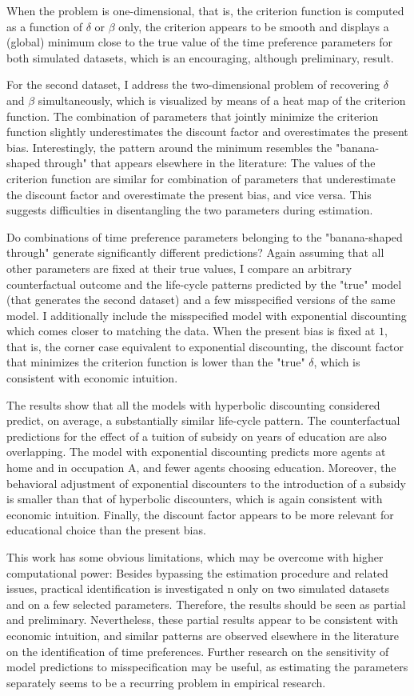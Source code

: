 When the problem is one-dimensional, that is, the criterion function is computed as a function of $\delta$ or $\beta$ only, the criterion appears to be smooth and displays a (global) minimum close to the true value of the time preference parameters for both simulated datasets, which is an encouraging, although preliminary, result. 

For the second dataset, I address the two-dimensional problem of recovering $\delta$ and $\beta$ simultaneously, which is visualized by means of a heat map of the criterion function. The combination of parameters that jointly minimize the criterion function slightly underestimates the discount factor and overestimates the present bias. Interestingly, the pattern around the minimum resembles the "banana-shaped through" that appears elsewhere in the literature: The values of the criterion function are similar for combination of parameters that underestimate the discount factor and overestimate the present bias, and vice versa. This suggests difficulties in disentangling the two parameters during estimation.

Do combinations of time preference parameters belonging to the "banana-shaped through" generate significantly different predictions? Again assuming that all other parameters are fixed at their true values, I compare an arbitrary counterfactual outcome and the life-cycle patterns predicted by the "true" model (that generates the second dataset) and a few misspecified versions of the same model. I additionally include the misspecified model with exponential discounting which comes closer to matching the data. When the present bias is fixed at $1$, that is, the corner case equivalent to exponential discounting, the discount factor that minimizes the criterion function is lower than the "true" $\delta$, which is consistent with economic intuition.

The results show that all the models with hyperbolic discounting considered predict, on average, a substantially similar life-cycle pattern. The counterfactual predictions for the effect of a tuition of subsidy on years of education are also overlapping. The model with exponential discounting predicts more agents at home and in occupation A, and fewer agents choosing education. Moreover, the behavioral adjustment of exponential discounters to the introduction of a subsidy is smaller than that of hyperbolic discounters, which is again consistent with economic intuition. Finally, the discount factor appears to be more relevant for educational choice than the present bias.

This work has some obvious limitations, which may be overcome with higher computational power: Besides bypassing the estimation procedure and related issues, practical identification is investigated n only on two simulated datasets and on a few selected parameters. Therefore, the results should be seen as partial and preliminary. 
Nevertheless, these partial results appear to be consistent with economic intuition, and similar patterns are observed elsewhere in the literature on the identification of time preferences. Further research on the sensitivity of model predictions to misspecification may be useful, as estimating the parameters separately seems to be a recurring problem in empirical research. 